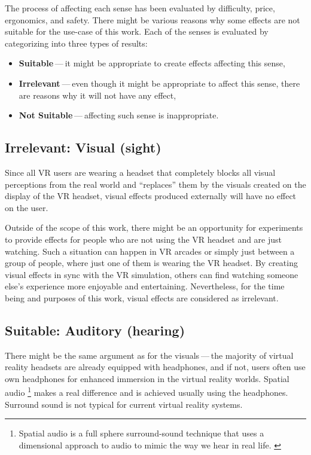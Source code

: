 The process of affecting each sense has been evaluated by difficulty,
price, ergonomics, and safety. There might be various reasons why some
effects are not suitable for the use-case of this work.
Each of the senses is evaluated by categorizing into three types of results:


\begin{itemize}

\item \textbf{Suitable} — it might be appropriate to create effects affecting this sense,

\item \textbf{Irrelevant} — even though it might be appropriate to affect this sense,
there are reasons why it will not have any effect,

\item \textbf{Not Suitable} — affecting such sense is inappropriate.

\end{itemize}


\hypertarget{x-irrelevant:-visual-(sight)}{\subsection{Irrelevant: Visual (sight)}}
Since all VR users are wearing a headset that completely blocks
all visual perceptions from the real world and ``replaces'' them by the visuals
created on the display of the VR headset, visual effects produced externally
will have no effect on the user.


Outside of the scope of this work, there might be an opportunity for experiments
to provide effects for people who are not using the VR headset and are
just watching. Such a situation can happen in VR arcades or simply
just between a group of people, where just one of them is wearing the VR headset.
By creating visual effects in sync with the VR
simulation, others can find watching someone else's experience
more enjoyable and entertaining. Nevertheless, for the time being and purposes
of this work, visual effects are considered as irrelevant.


\hypertarget{x-suitable:-auditory-(hearing)}{\subsection{Suitable: Auditory (hearing)}}
There might be the same argument as for the visuals — the majority of virtual reality headsets are already equipped with
headphones, and if not, users often use own headphones for
enhanced immersion in the virtual reality worlds.
Spatial audio
\footnote{Spatial audio is a full sphere surround-sound technique that uses a 
dimensional approach to audio to mimic the way we hear in real life. \cite{spaudio}}
makes a real difference and is achieved usually using the headphones.
Surround sound is not typical for current virtual reality systems.

